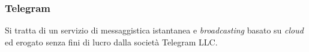 
\subsubsection*{Telegram}
Si tratta di un servizio di messaggistica istantanea e \textit{broadcasting}
basato su \textit{cloud} ed erogato senza fini di lucro dalla società Telegram
LLC.

\newpage
